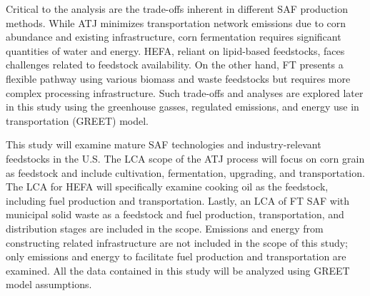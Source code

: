 \documentclass[12pt]{article}
\begin{document}
\begin{Appendix}
Critical to the analysis are the trade-offs inherent in different SAF production methods. While ATJ minimizes transportation network emissions due to corn abundance and existing infrastructure, corn fermentation requires significant quantities of water and energy. HEFA, reliant on lipid-based feedstocks, faces challenges related to feedstock availability. On the other hand, FT presents a flexible pathway using various biomass and waste feedstocks but requires more complex processing infrastructure. Such trade-offs and analyses are explored later in this study using the greenhouse gasses, regulated emissions, and energy use in transportation (GREET) model.

This study will examine mature SAF technologies and industry-relevant feedstocks in the U.S. The LCA scope of the ATJ process will focus on corn grain as feedstock and include cultivation, fermentation, upgrading, and transportation. The LCA for HEFA will specifically examine cooking oil as the feedstock, including fuel production and transportation. Lastly, an LCA of FT SAF with municipal solid waste as a feedstock and fuel production, transportation, and distribution stages are included in the scope. Emissions and energy from constructing related infrastructure are not included in the scope of this study; only emissions and energy to facilitate fuel production and transportation are examined. All the data contained in this study will be analyzed using GREET model assumptions.


\end{Appendix}
\end{document}
